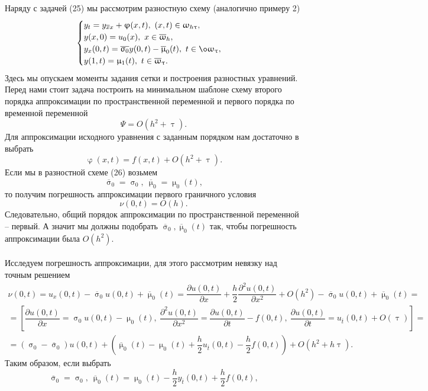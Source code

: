 \documentclass[a4paper, 12pt]{report}
\numberwithin{equation}{section}
\newcommand{\ol}{\overline}
\renewcommand{\varphi}{\upvarphi}
\renewcommand{\tau}{\uptau}
\renewcommand{\sigma}{\upsigma}
\renewcommand{\mu}{\upmu}
\renewcommand{\omega}{\upomega}
\renewcommand{\d}{\partial}
\begin{document}
	\\\\
	Наряду с задачей (25) мы рассмотрим разностную схему (аналогично примеру 2)
	\begin{equation}
		\begin{cases}
			y_t = y_{\ol x x} + \varphi(x,t),\ (x,t) \in \omega_{h\tau},\\
		y(x,0) = u_0(x),\ x \in \ol\omega_h,\\
		y_x(0, t) = \overline{\sigma_0} y(0,t) - \ol \mu_0 (t),\ t \in \o \omega_\tau,\\
		y(1,t) = \mu_1(t),\ t \in \ol \omega_\tau.
		\end{cases}
	\end{equation}
	Здесь мы опускаем моменты задания сетки и построения разностных уравнений. Перед нами стоит задача построить на минимальном шаблоне схему второго порядка аппроксимации по пространственной переменной и первого порядка по временной переменной $$\Psi = O(h^2+\tau).$$
	Для аппроксимации исходного уравнения с заданным порядком нам достаточно в выбрать $$\varphi(x,t) = f(x,t) + O(h^2 + \tau).$$
	Если мы в разностной схеме (26) возьмем $$\ol \sigma_0=\sigma_0,\ \ol \mu_0 = \mu_0(t),$$
	то получим погрешность аппроксимации первого граничного условия
	$$\nu(0,t) = O(h).$$
	Следовательно, общий порядок аппроксимации по пространственной переменной -- первый. А значит мы должны подобрать $\ol \sigma_0, \ol \mu_0(t)$ так, чтобы погрешность аппроксимации была $O(h^2)$. \\\\
	Исследуем погрешность аппроксимации, для этого рассмотрим невязку над точным решением
	\begin{multline*}
		\nu(0,t) = u_x(0,t) - \ol \sigma_0 u(0,t) + \ol \mu_0(t) = \dfrac{\d u(0,t)}{\d x} + \dfrac h2 \dfrac{\d ^2 u(0,t)}{\d x^2} + O(h^2) - \ol \sigma_0 u(0,t) + \ol \mu_0(t) =\\=\left[\dfrac{\d u(0,t)}{\d x} = \sigma_0 u(0,t) - \mu_0(t),\ \dfrac{\d ^2 u(0,t)}{\d x^2}  = \dfrac{\d u (0,t)}{\d t} - f(0,t),\  \dfrac{\d u (0,t)}{\d t} = u_{\ol t}(0,t) + O(\tau)\right]=\\= (\sigma_0 - \ol \sigma_0) u(0,t) + \left(\ol \mu_0(t) - \mu_0(t) + \dfrac{h}{2} u_{\ol t}(0,t) - \dfrac h2 f(0,t)\right) + O(h^2 + h\tau).
	\end{multline*}
	Таким образом, если выбрать 
	\begin{equation}
		\ol \sigma_0 = \sigma_0,\ \ol \mu_0(t) = \mu_0(t) - \dfrac h2 y_{\ol t}(0,t) + \dfrac h2 f(0,t),
	\end{equation}
\end{document}
